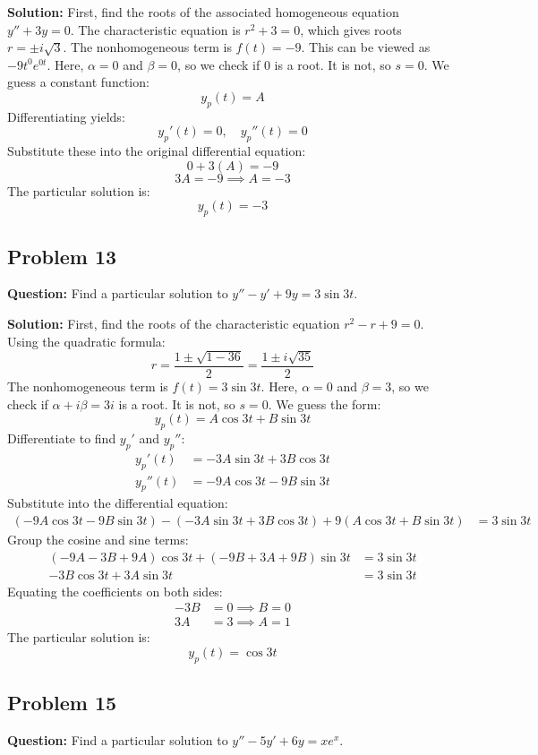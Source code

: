 \documentclass[12pt]{article}
\begin{document}
\textbf{Solution:}
First, find the roots of the associated homogeneous equation $y'' + 3y = 0$.
The characteristic equation is $r^2 + 3 = 0$, which gives roots $r = \pm i\sqrt{3}$.
The nonhomogeneous term is $f(t) = -9$. This can be viewed as $-9 t^0 e^{0t}$. Here, $\alpha = 0$ and $\beta = 0$, so we check if $0$ is a root. It is not, so $s = 0$.
We guess a constant function:
\[ y_p(t) = A \]
Differentiating yields:
\[ y_p'(t) = 0, \quad y_p''(t) = 0 \]
Substitute these into the original differential equation:
\[ 0 + 3(A) = -9 \]
\[ 3A = -9 \implies A = -3 \]
The particular solution is:
\[ y_p(t) = -3 \]

\subsection{Problem 13}
\textbf{Question:} Find a particular solution to $y'' - y' + 9y = 3 \sin 3t$.

\textbf{Solution:}
First, find the roots of the characteristic equation $r^2 - r + 9 = 0$.
Using the quadratic formula:
\[ r = \frac{1 \pm \sqrt{1 - 36}}{2} = \frac{1 \pm i\sqrt{35}}{2} \]
The nonhomogeneous term is $f(t) = 3 \sin 3t$. Here, $\alpha = 0$ and $\beta = 3$, so we check if $\alpha + i\beta = 3i$ is a root. It is not, so $s = 0$.
We guess the form:
\[ y_p(t) = A \cos 3t + B \sin 3t \]
Differentiate to find $y_p'$ and $y_p''$:
\begin{align*}
    y_p'(t) &= -3A \sin 3t + 3B \cos 3t \\
    y_p''(t) &= -9A \cos 3t - 9B \sin 3t
\end{align*}
Substitute into the differential equation:
\begin{align*}
    (-9A \cos 3t - 9B \sin 3t) - (-3A \sin 3t + 3B \cos 3t) + 9(A \cos 3t + B \sin 3t) &= 3 \sin 3t
\end{align*}
Group the cosine and sine terms:
\begin{align*}
    (-9A - 3B + 9A)\cos 3t + (-9B + 3A + 9B)\sin 3t &= 3 \sin 3t \\
    -3B \cos 3t + 3A \sin 3t &= 3 \sin 3t
\end{align*}
Equating the coefficients on both sides:
\begin{align*}
    -3B &= 0 \implies B = 0 \\
    3A &= 3 \implies A = 1
\end{align*}
The particular solution is:
\[ y_p(t) = \cos 3t \]

\subsection{Problem 15}
\textbf{Question:} Find a particular solution to $y'' - 5y' + 6y = x e^x$.
\end{document}
